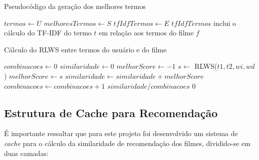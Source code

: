 \begin{algorithm}
	\caption{Pseudocódigo da geração dos melhores termos}
	\begin{algorithmic}[1]
            \State  $termos\gets U$
            \State  $melhoresTermos\gets S$
            \State  $tfIdfTermos\gets E$
                    \State $tfIdfTermos$ {inclui o cálculo do TF-IDF do termo $t$ em relação aos termos do filme $f$}
                \EndFor
            \EndFor
        \EndFunction
    \end{algorithmic}
\end{algorithm}

\begin{algorithm}
	\caption{Cálculo do RLWS entre termos do usuário e do filme}
	\begin{algorithmic}[1]
        	\State $combinacoes\gets 0$
        	\State $similaridade\gets 0$
        		\State $melhorScore\gets -1$
        			\State $s\gets$ RLWS($t1, t2, wi, wd$)
        				$melhorScore\gets s$
        			\EndIf
        		\EndFor
        			$similaridade\gets similaridade + melhorScore$
        			$combinacoes\gets combinacoes + 1$
        		\EndIf        		      	
        	\EndFor
				\Return $similaridade / combinacoes$
			\Else
				\Return $0$
			\EndIf
        \EndFunction
    \end{algorithmic}
\end{algorithm}

\label{ssec:cache}
\subsection{Estrutura de Cache para Recomendação}

É importante ressaltar que para este projeto foi desenvolvido um sistema de \textit{cache} para o cálculo da similaridade de recomendação dos filmes, dividido-se em duas camadas:

